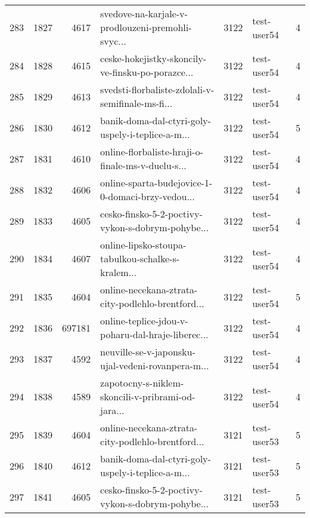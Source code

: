 \begin{tabular}{lrrlrlr}
283  &       1827 &     4617 &  svedove-na-karjale-v-prodlouzeni-premohli-svyc... &     3122 &                  test-user54 &               4 \\
284  &       1828 &     4615 &  ceske-hokejistky-skoncily-ve-finsku-po-porazce... &     3122 &                  test-user54 &               4 \\
285  &       1829 &     4613 &  svedsti-florbaliste-zdolali-v-semifinale-ms-fi... &     3122 &                  test-user54 &               4 \\
286  &       1830 &     4612 &  banik-doma-dal-ctyri-goly-uspely-i-teplice-a-m... &     3122 &                  test-user54 &               5 \\
287  &       1831 &     4610 &  online-florbaliste-hraji-o-finale-ms-v-duelu-s... &     3122 &                  test-user54 &               4 \\
288  &       1832 &     4606 &  online-sparta-budejovice-1-0-domaci-brzy-vedou... &     3122 &                  test-user54 &               4 \\
289  &       1833 &     4605 &  cesko-finsko-5-2-poctivy-vykon-s-dobrym-pohybe... &     3122 &                  test-user54 &               4 \\
290  &       1834 &     4607 &  online-lipsko-stoupa-tabulkou-schalke-s-kralem... &     3122 &                  test-user54 &               4 \\
291  &       1835 &     4604 &  online-necekana-ztrata-city-podlehlo-brentford... &     3122 &                  test-user54 &               5 \\
292  &       1836 &   697181 &  online-teplice-jdou-v-poharu-dal-hraje-liberec... &     3122 &                  test-user54 &               4 \\
293  &       1837 &     4592 &  neuville-se-v-japonsku-ujal-vedeni-rovanpera-m... &     3122 &                  test-user54 &               4 \\
294  &       1838 &     4589 &  zapotocny-s-niklem-skoncili-v-pribrami-od-jara... &     3122 &                  test-user54 &               4 \\
295  &       1839 &     4604 &  online-necekana-ztrata-city-podlehlo-brentford... &     3121 &                  test-user53 &               5 \\
296  &       1840 &     4612 &  banik-doma-dal-ctyri-goly-uspely-i-teplice-a-m... &     3121 &                  test-user53 &               5 \\
297  &       1841 &     4605 &  cesko-finsko-5-2-poctivy-vykon-s-dobrym-pohybe... &     3121 &                  test-user53 &               5 \\

\end{tabular}
